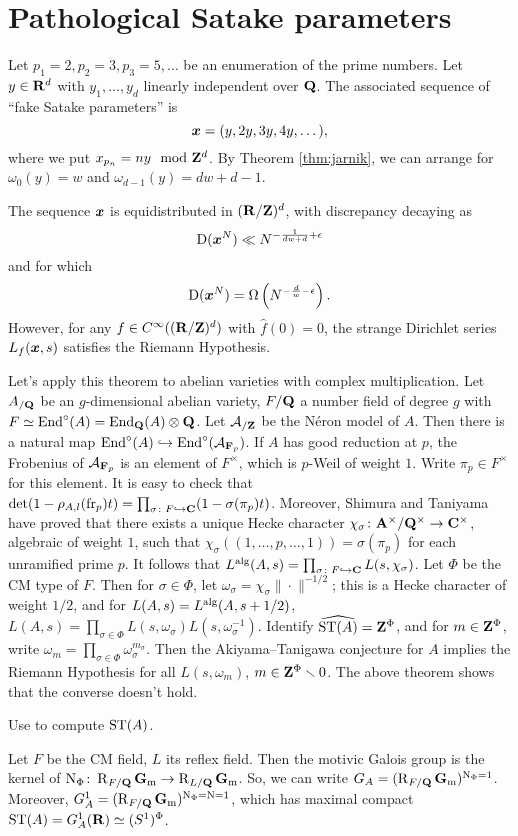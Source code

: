 \section{Pathological Satake parameters}

Let $p_1 = 2, p_2 = 3, p_3 = 5, \dots$ be an enumeration of the prime numbers. 
Let $y\in \mathbf{R}^d$ with $y_1,\dots,y_d$ linearly independent over $\mathbf{Q}$. The 
associated sequence of ``fake Satake parameters'' is 
\[
	{\boldsymbol x} = (y, 2y, 3 y, 4 y, \dots) ,
\]
where we put $x_{p_n} = n y\mod {\mathbf{Z}}^d$. By Theorem \ref{thm:jarnik}, we can 
arrange for $\omega_0(y) = w$ and $\omega_{d-1}(y) = d w + d - 1$. 

\begin{theorem}
The sequence ${\boldsymbol x}$ is equidistributed in $(\mathbf{R}/\mathbf{Z})^d$, with discrepancy 
decaying as 
\[
	\operatorname{D}({\boldsymbol x}^N) \ll N^{-\frac{1}{d w+d} + \epsilon} 
\]
and for which 
\[
	\operatorname{D}({\boldsymbol x}^N) = \Omega\left(N^{-\frac{d}{w} - \epsilon}\right) .
\]
However, for any $f\in C^\infty((\mathbf{R}/\mathbf{Z})^d)$ with $\widehat f(0)=0$, the 
strange Dirichlet series  $L_f({\boldsymbol x},s)$ satisfies the Riemann Hypothesis. 
\end{theorem}

Let's apply this theorem to abelian varieties with complex multiplication. 
Let $A_{/\mathbf{Q}}$ be an $g$-dimensional abelian variety, $F/\mathbf{Q}$ a number field 
of degree $g$ with $F\simeq \operatorname{End}^\circ(A) = \operatorname{End}_{\mathbf{Q}}(A)\otimes \mathbf{Q}$. Let 
$\mathcal{A}_{/\mathbf{Z}}$ be the N\'eron model of $A$. Then there is a natural map 
$\operatorname{End}^\circ(A) \hookrightarrow \operatorname{End}^\circ(\mathcal{A}_{\mathbf{F}_p})$. If $A$ has good 
reduction at $p$, the Frobenius of $\mathcal{A}_{\mathbf{F}_p}$ is an element of $F^\times$, 
which is $p$-Weil of weight $1$. Write $\pi_p\in F^\times$ for this element. It 
is easy to check that 
$\det(1-\rho_{A,l}(\mathrm{fr}_p) t) = \prod_{\sigma\colon F\hookrightarrow \mathbf{C}} (1 - \sigma(\pi_p) t)$. 
Moreover, Shimura and Taniyama have proved that there exists a unique Hecke 
character $\chi_\sigma\colon \mathbf{A}^\times/\mathbf{Q}^\times \to \mathbf{C}^\times$, algebraic 
of weight $1$, such that $\chi_\sigma((1,\dots,p,\dots,1)) = \sigma(\pi_p)$ 
for each unramified prime $p$. It follows that 
$L^{\mathrm{alg}}(A,s) = \prod_{\sigma\colon F\hookrightarrow \mathbf{C}} L(s,\chi_\sigma)$. 
Let $\Phi$ be the CM type of $F$. Then for $\sigma\in \Phi$, let 
$\omega_\sigma = \chi_\sigma \|\cdot\|^{-1/2}$; this is a Hecke character of 
weight $1/2$, and for $L(A,s) = L^{\mathrm{alg}}(A,s+1/2)$, 
$L(A,s) = \prod_{\sigma\in\Phi} L(s,\omega_\sigma) L(s,\omega_\sigma^{-1})$. 
Identify $\widehat{\mathrm{ST}(A)} = \mathbf{Z}^\Phi$, and for $m\in \mathbf{Z}^\Phi$, write 
$\omega_m = \prod_{\sigma\in \Phi} \omega_\sigma^{m_\sigma}$. Then the 
Akiyama--Tanigawa conjecture for $A$ implies the Riemann Hypothesis for all 
$L(s,\omega_m)$, $m\in \mathbf{Z}^\Phi\smallsetminus 0$. The above theorem shows that 
the converse doesn't hold. 

Use \cite{yu-2015} to compute $\mathrm{ST}(A)$. 

Let $F$ be the CM field, $L$ its reflex field. Then the motivic Galois group 
is the kernel of $\operatorname{N}_\Phi\colon \operatorname{R}_{F/\mathbf{Q}} \mathbf{G}_\mathrm{m} \to \operatorname{R}_{L/\mathbf{Q}} \mathbf{G}_\mathrm{m}$. So, 
we can write $G_A = (\operatorname{R}_{F/\mathbf{Q}}\mathbf{G}_\mathrm{m})^{\operatorname{N}_\Phi = 1}$. Moreover, 
$G_A^1 = (\operatorname{R}_{F/\mathbf{Q}}\mathbf{G}_\mathrm{m})^{\operatorname{N}_\Phi = \operatorname{N} = 1}$, which has maximal compact 
$\mathrm{ST}(A) = G_A^1(\mathbf{R})\simeq (S^1)^\Phi$. 
